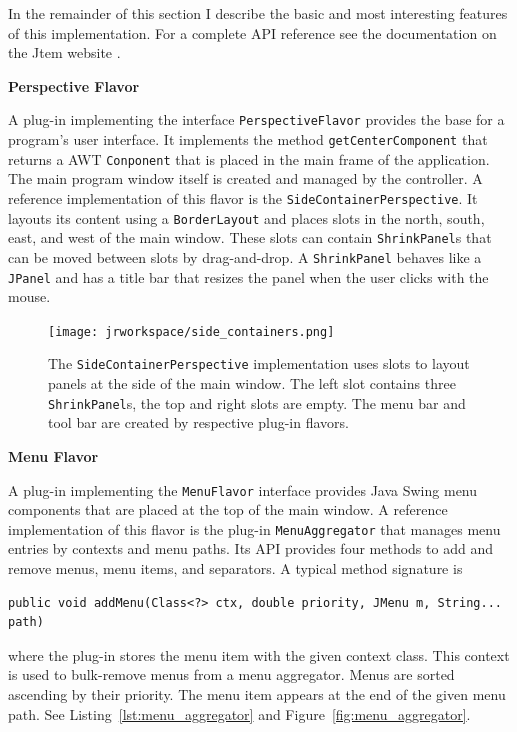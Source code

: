 In the remainder of this section I describe the basic and most interesting features of this 
implementation. For a complete API reference see the documentation on the {\sc Jtem} website 
\cite{JtemWebsite}.


{\bf Perspective Flavor}

A plug-in implementing the interface {\tt PerspectiveFlavor} provides the base for a program's user 
interface. It implements the method {\tt getCenterComponent} that returns a AWT {\tt Conponent}
that is placed in the main frame of the application. The main program window itself is created and
managed by the controller.
A reference implementation of this flavor is the {\tt SideContainerPerspective}. It layouts its content 
using a {\tt BorderLayout} and places slots in the north, south, east, and west of the main window. These
slots can contain {\tt ShrinkPanel}s that can be moved between slots by drag-and-drop. A {\tt ShrinkPanel}
behaves like a {\tt JPanel} and has a title bar that resizes the panel when the user clicks with the mouse.

\begin{figure}[H]
\centering
\texttt{[image: jrworkspace/side\_containers.png]}
\caption[The {\tt SideContainerPerspective} user interface plug-in]{The {\tt SideContainerPerspective} implementation uses slots to layout panels at the side of the
main window. The left slot contains three {\tt ShrinkPanel}s, the top and right slots are empty. The menu bar 
and tool bar are created by respective plug-in flavors.}
\label{fig:side_containers}
\end{figure}


{\bf Menu Flavor}

A plug-in implementing the {\tt MenuFlavor} interface provides {\sc Java Swing\TReg} menu 
components that are placed at the top of the main window. A reference implementation of this
flavor is the plug-in {\tt MenuAggregator} that manages menu entries by contexts and
menu paths. Its API provides four methods to add and remove menus, menu items, and
separators. A typical method signature is

\begin{lstlisting}[numbers=none]
	public void addMenu(Class<?> ctx, double priority, JMenu m, String... path)
\end{lstlisting}

where the plug-in stores the menu item with the given context class. This context is used to
bulk-remove menus from a menu aggregator. Menus are sorted ascending
by their priority. The menu item appears at the end of the given menu path. See 
Listing~\ref{lst:menu_aggregator} and Figure~\ref{fig:menu_aggregator}.


